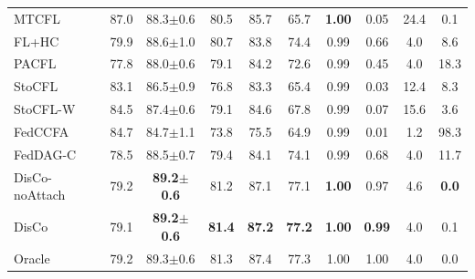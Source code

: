 \begin{tabular}{lccccccccc}
MTCFL & 87.0 & 88.3$\pm$0.6 & 80.5 & 85.7 & 65.7 & \textbf{1.00} & 0.05 & 24.4 & 0.1 \\
FL+HC & 79.9 & 88.6$\pm$1.0 & 80.7 & 83.8 & 74.4 & 0.99 & 0.66 & 4.0 & 8.6 \\
PACFL & 77.8 & 88.0$\pm$0.6 & 79.1 & 84.2 & 72.6 & 0.99 & 0.45 & 4.0 & 18.3 \\
StoCFL & 83.1 & 86.5$\pm$0.9 & 76.8 & 83.3 & 65.4 & 0.99 & 0.03 & 12.4 & 8.3 \\
StoCFL-W & 84.5 & 87.4$\pm$0.6 & 79.1 & 84.6 & 67.8 & 0.99 & 0.07 & 15.6 & 3.6 \\
FedCCFA & 84.7 & 84.7$\pm$1.1 & 73.8 & 75.5 & 64.9 & 0.99 & 0.01 & 1.2 & 98.3 \\
FedDAG-C & 78.5 & 88.5$\pm$0.7 & 79.4 & 84.1 & 74.1 & 0.99 & 0.68 & 4.0 & 11.7 \\
DisCo-noAttach & 79.2 & \textbf{89.2$\pm$0.6} & 81.2 & 87.1 & 77.1 & \textbf{1.00} & 0.97 & 4.6 & \textbf{0.0} \\
DisCo & 79.1 & \textbf{89.2$\pm$0.6} & \textbf{81.4} & \textbf{87.2} & \textbf{77.2} & \textbf{1.00} & \textbf{0.99} & 4.0 & 0.1 \\
Oracle & 79.2 & 89.3$\pm$0.6 & 81.3 & 87.4 & 77.3 & 1.00 & 1.00 & 4.0 & 0.0 \\
\bottomrule
\end{tabular}
